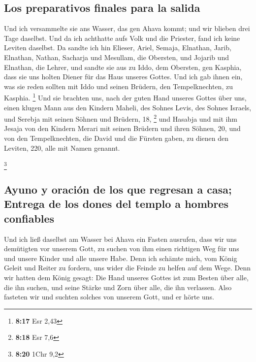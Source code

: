 \hypertarget{los-preparativos-finales-para-la-salida}{%
\subsection{Los preparativos finales para la
salida}\label{los-preparativos-finales-para-la-salida}}

 Und ich versammelte sie ans Wasser, das gen Ahava kommt;
und wir blieben drei Tage daselbst. Und da ich achthatte aufs Volk und
die Priester, fand ich keine Leviten daselbst.  Da sandte
ich hin Elieser, Ariel, Semaja, Elnathan, Jarib, Elnathan, Nathan,
Sacharja und Mesullam, die Obersten, und Jojarib und Elnathan, die
Lehrer,  und sandte sie aus zu Iddo, dem Obersten, gen
Kasphia, dass sie uns holten Diener für das Haus unseres Gottes. Und ich
gab ihnen ein, was sie reden sollten mit Iddo und seinen Brüdern, den
Tempelknechten, zu Kasphia. \footnote{\textbf{8:17} Esr 2,43}
 Und sie brachten uns, nach der guten Hand unseres Gottes
über uns, einen klugen Mann aus den Kindern Maheli, des Sohnes Levis,
des Sohnes Israels, und Serebja mit seinen Söhnen und Brüdern, 18,
\footnote{\textbf{8:18} Esr 7,6}  und Hasabja und mit ihm
Jesaja von den Kindern Merari mit seinen Brüdern und ihren Söhnen, 20,
 und von den Tempelknechten, die David und die Fürsten
gaben, zu dienen den Leviten, 220, alle mit Namen genannt.

\footnote{\textbf{8:20} 1Chr 9,2}

\hypertarget{ayuno-y-oraciuxf3n-de-los-que-regresan-a-casa-entrega-de-los-dones-del-templo-a-hombres-confiables}{%
\subsection{Ayuno y oración de los que regresan a casa; Entrega de los
dones del templo a hombres
confiables}\label{ayuno-y-oraciuxf3n-de-los-que-regresan-a-casa-entrega-de-los-dones-del-templo-a-hombres-confiables}}

 Und ich ließ daselbst am Wasser bei Ahava ein Fasten
ausrufen, dass wir uns demütigten vor unserem Gott, zu suchen von ihm
einen richtigen Weg für uns und unsere Kinder und alle unsere Habe.
 Denn ich schämte mich, vom König Geleit und Reiter zu
fordern, uns wider die Feinde zu helfen auf dem Wege. Denn wir hatten
dem König gesagt: Die Hand unseres Gottes ist zum Besten über alle, die
ihn suchen, und seine Stärke und Zorn über alle, die ihn verlassen.
 Also fasteten wir und suchten solches von unserem Gott,
und er hörte uns.

